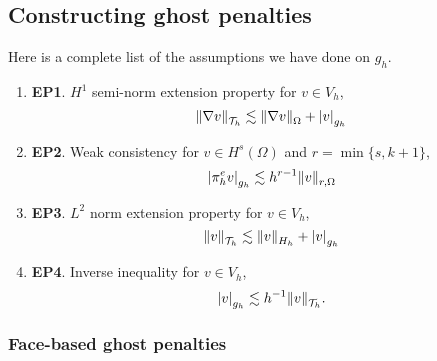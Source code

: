 \subsection{Constructing ghost penalties}%
\label{sub:constructing_ghost_penalties}

Here is a complete list of the assumptions we have done on $g_{h}$.

\begin{enumerate}[label=(\roman*)]
\item \textbf{EP1}.
    $H^{1}$ semi-norm extension property for $v \in  V_{h}$,  \[
    \| \nabla v \|_{ \mathcal{T} _{h} }^{  }  \lesssim \| \nabla v \|_{ \Omega  }^{  }  + \left\lvert  v  \right\rvert _{g_{h}}
    \]
\item \textbf{EP2}.
    Weak consistency for $v \in H^{s}( \Omega ) $ and $r = \min\{s, k+1\} $, \[
    \left\lvert  \pi ^{e}_{h} v  \right\rvert_{g_{h}} \lesssim  h^{r-1} \| v \|_{ r,\Omega  }^{  }
    \]

\item \textbf{EP3}.
    $L^{2}$ norm extension property for $v \in V_{h}$,\[
    \| v \|_{ \mathcal{T} _{h} }^{  } \lesssim \| v  \|_{H_{h}  }^{  }   + \left\lvert  v  \right\rvert _{g_{h}}
    \]
    \item\textbf{EP4}.
    Inverse inequality for $v \in  V_{h}$,
    \[
    \left\lvert  v  \right\rvert _{g_{h}} \lesssim h^{-1} \| v \|_{ \mathcal{T} _{h} }^{  } .
    \]
\end{enumerate}


\subsubsection{Face-based ghost penalties}%
\label{ssub:face_based_ghost_penalties}



